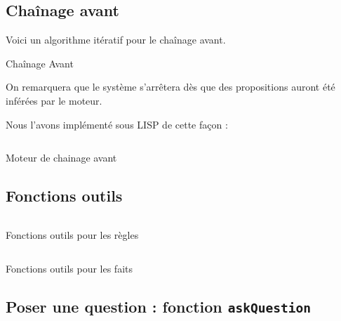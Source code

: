 \documentclass[a4paper,12pt]{article}
\begin{document}
\subsection{Chaînage avant}

Voici un algorithme itératif pour le chaînage avant.
\begin{algorithm}
\caption{Chaînage Avant \label{algoChainageAvant}}
\end{algorithm}

On remarquera que le système s'arrêtera dès que des propositions auront été inférées par le moteur. 


Nous l'avons implémenté sous LISP de cette façon :

\begin{listing}[H]
	\centering
	\inputminted[breaklines=true,linenos]{lisp}{../chainageAvantLarg.lisp}
	\caption{Moteur de chainage avant}
\end{listing}

\subsection{Fonctions outils}

\begin{listing}[H]
	\centering
	\inputminted[breaklines=true,linenos]{lisp}{../fonctionsOutilsRegles.lisp}
	\caption{Fonctions outils pour les règles}
\end{listing}

\begin{listing}[H]
	\centering
	\inputminted[breaklines=true,linenos]{lisp}{../fonctionsOutilsFaits.lisp}
	\caption{Fonctions outils pour les faits}
\end{listing}

\subsection{Poser une question : fonction \texttt{askQuestion}}
\end{document}
